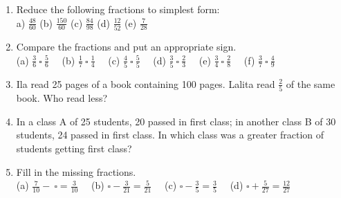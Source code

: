 \documentclass[a4paper,leqno,12pt]{amsart}
\begin{document}
\begin{enumerate}
\quad
(c)
\quad
(d)

\item Reduce the following fractions to simplest form:\\

a) $\frac{48}{60}$ \quad (b) $\frac{150}{60}$ \quad (c) $\frac{84}{98}$ \quad (d) $\frac{12}{52}$ \quad (e) $\frac{7}{28}$

\item Compare the fractions and put an appropriate sign.\\

(a) $\frac{3}{6} \ \square \ \frac{5}{6} \quad$ (b) $\frac{1}{7} \ \square \ \frac{1}{4} \quad$ (c) $\frac{4}{5} \ \square \ \frac{5}{5} \quad$ (d) $\frac{3}{5} \ \square \ \frac{2}{3} \quad$ 
(e) $\frac{3}{4} \ \square \ \frac{2}{8} \quad$ (f) $\frac{3}{7} \ \square \ \frac{4}{9}$

\item Ila read 25 pages of a book containing 100 pages. Lalita read $\frac{2}{5}$ of the same book. Who read less?

\item In a class A of 25 students, 20 passed in first class; in another class B of 30
students, 24 passed in first class. In which class was a greater fraction of students
getting first class?

\item Fill in the missing fractions.\\

(a) $\frac{7}{10} - \ \square = \frac{3}{10} \quad$ (b) $\square - \frac{3}{21} = \frac{5}{21} \quad$ (c) $\square - \frac{3}{5} = \frac{3}{5} \quad$ (d) $\square + \frac{5}{27} = \frac{12}{27} \quad$ 


\end{enumerate}
\end{document}
